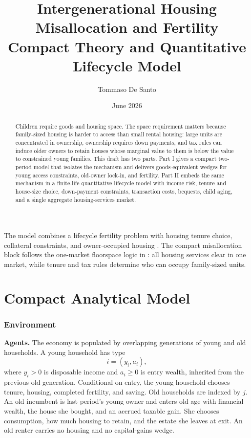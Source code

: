 \documentclass[11pt]{article}
\title{Intergenerational Housing Misallocation and Fertility\\[-0.15em]
\large Compact Theory and Quantitative Lifecycle Model}
\author{Tommaso De Santo}
\date{June 2026}
\newcommand{\1}{\mathbf 1}
\begin{document}
\maketitle

\begin{abstract}
Children require goods and housing space. The space requirement matters because
family-sized housing is harder to access than small rental housing: large units
are concentrated in ownership, ownership requires down payments, and tax rules
can induce older owners to retain houses whose marginal value to them is below
the value to constrained young families. This draft has two parts. Part I gives
a compact two-period model that isolates the mechanism and delivers
goods-equivalent wedges for young access constraints, old-owner lock-in, and
fertility. Part II embeds the same mechanism in a finite-life quantitative
lifecycle model with income risk, tenure and house-size choice, down-payment
constraints, transaction costs, bequests, child aging, and a single aggregate
housing-services market.
\end{abstract}

The model combines a lifecycle fertility problem
\citep{sommerFertilityChoiceLife2016,doepkeBargainingBabiesTheory2019} with
housing tenure choice, collateral constraints, and owner-occupied housing
\citep{hendersonModelHousingTenure1983,sommerEquilibriumEffectFundamentals2013,sommerImplicationsUSTax2018}.
The compact misallocation block follows the one-market floorspace logic in
\citet{coven2024}: all housing services clear in one market, while tenure and
tax rules determine who can occupy family-sized units.

\clearpage
\tableofcontents
\clearpage

\part{Compact Analytical Model}

\section{Environment}

\textbf{Agents.} The economy is populated by overlapping generations of young
and old households. A young household has type
\[
    i=(y_i,a_i),
\]
where $y_i>0$ is disposable income and $a_i\ge0$ is entry wealth, inherited from
the previous old generation. Conditional on entry, the young household chooses
tenure, housing, completed fertility, and saving. Old households are indexed by
$j$. An old incumbent is last period's young owner and enters old age with
financial wealth, the house she bought, and an accrued taxable gain. She chooses
consumption, how much housing to retain, and the estate she leaves at exit. An
old renter carries no housing and no capital-gains wedge.
\end{document}
